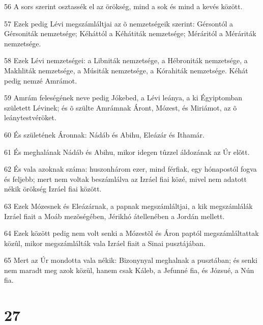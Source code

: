 \par 56 A sors szerint osztassék el az örökség, mind a sok és mind a kevés között.
\par 57 Ezek pedig Lévi megszámláltjai az õ nemzetségeik szerint: Gérsontól a Gérsoniták nemzetsége; Kéháttól a Kéhátiták nemzetsége; Méráritól a Méráriták nemzetsége.
\par 58 Ezek Lévi nemzetségei: a Libniták nemzetsége, a Hébroniták nemzetsége, a Makhliták nemzetsége, a Músiták nemzetsége, a Kórahiták nemzetsége. Kéhát pedig nemzé Amrámot.
\par 59 Amrám feleségének neve pedig Jókebed, a Lévi leánya, a ki Égyiptomban született Lévinek; és õ szülte Amrámnak Áront, Mózest, és Miriámot, az õ leánytestvéröket.
\par 60 És születének Áronnak: Nádáb és Abihu, Eleázár és Ithamár.
\par 61 És meghalának Nádáb és Abihu, mikor idegen tûzzel áldozának az Úr elõtt.
\par 62 És vala azoknak száma: huszonhárom ezer, mind férfiak, egy hónapostól fogva és feljebb; mert nem voltak beszámlálva az Izráel fiai közé, mivel nem adatott nékik örökség Izráel fiai között.
\par 63 Ezek Mózesnek és Eleázárnak, a papnak megszámláltjai, a kik megszámlálák Izráel fiait a Moáb mezõségében, Jérikhó átellenében a Jordán mellett.
\par 64 Ezek között pedig nem volt senki a Mózestõl és Áron paptól megszámláltattak közûl, mikor megszámlálták vala Izráel fiait a Sinai pusztájában.
\par 65 Mert az Úr mondotta vala nékik: Bizonynyal meghalnak a pusztában; és senki nem maradt meg azok közül, hanem csak Káleb, a Jefunné fia, és Józsué, a Nún fia.

\chapter{27}

